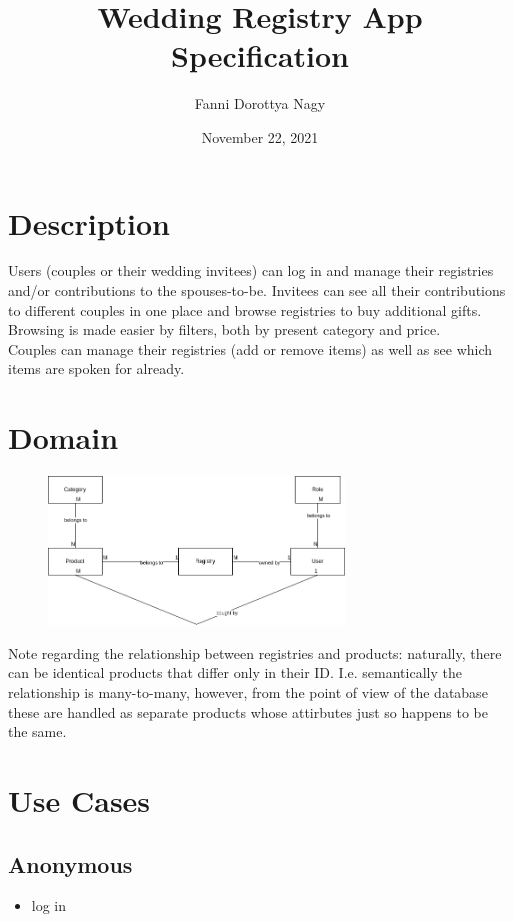 \documentclass[11pt]{article}
\author{Fanni Dorottya Nagy}
\date{November 22, 2021}
\title{Wedding Registry App Specification}
\begin{document}
    \maketitle

    \section{Description}
    Users (couples or their wedding invitees) can log in and manage their registries and/or contributions to the spouses-to-be.
    Invitees can see all their contributions to different couples in one place and browse registries to buy additional gifts.
    Browsing is made easier by filters, both by present category and price. \\
    Couples can manage their registries (add or remove items) as well as see which items are spoken for already.

    \section{Domain}
    \begin{figure}[h]
        \centering
        \includegraphics[width=0.7\textwidth]{domain.png}
    \end{figure}
    Note regarding the relationship between registries and products: naturally, there can be identical products that differ only in their ID.
    I.e. semantically the relationship is many-to-many, however, from the point of view of the database these are handled as separate products whose attirbutes just so happens to be the same.

    \section{Use Cases}
    \subsection*{Anonymous}
    \begin{itemize}
        \item log in
    \end{itemize}
\end{document}
